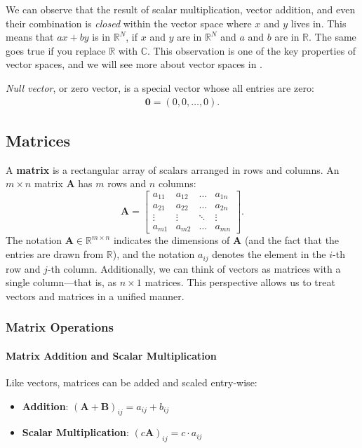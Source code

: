We can observe that the result of scalar multiplication, vector addition, and even their combination is \emph{closed} within the vector space where $x$ and $y$ lives in.
This means that $ax + by$ is in $\mathbb{R}^N$, if $x$ and $y$ are in $\mathbb{R}^N$ and $a$ and $b$ are in $\mathbb{R}$.
The same goes true if you replace $\mathbb{R}$ with $\mathbb{C}$.
This observation is one of the key properties of vector spaces, and we will see more about vector spaces in .

\emph{Null vector}, or zero vector, is a special vector whose all entries are zero:
\begin{align*}
  \boldsymbol{0} = (0, 0, \dots, 0).
\end{align*}


\subsection{Matrices}
A \textbf{matrix} is a rectangular array of scalars arranged in rows and columns. An $ m \times n $ matrix $ \mathbf{A} $ has $ m $ rows and $ n $ columns:
\begin{equation*}
    \mathbf{A} = \begin{bmatrix} 
        a_{11} & a_{12} & \ldots & a_{1n} \\ 
        a_{21} & a_{22} & \ldots & a_{2n} \\ 
        \vdots & \vdots & \ddots & \vdots \\ 
        a_{m1} & a_{m2} & \ldots & a_{mn} 
    \end{bmatrix}.
\end{equation*}
The notation $ \mathbf{A} \in \mathbb{R}^{m \times n} $ indicates the dimensions of $ \mathbf{A} $ (and the fact that the entries are drawn from $\mathbb{R}$), and the notation $ a_{ij} $ denotes the element in the $ i $-th row and $ j $-th column.
Additionally, we can think of vectors as matrices with a single column---that is, as $ n \times 1 $ matrices.
This perspective allows us to treat vectors and matrices in a unified manner.

\subsubsection{Matrix Operations}

\paragraph*{Matrix Addition and Scalar Multiplication}
Like vectors, matrices can be added and scaled entry-wise:
\begin{itemize}
    \item \textbf{Addition}: $ (\mathbf{A} + \mathbf{B})_{ij} = a_{ij} + b_{ij} $
    \item \textbf{Scalar Multiplication}: $ (c\mathbf{A})_{ij} = c \cdot a_{ij} $
\end{itemize}

